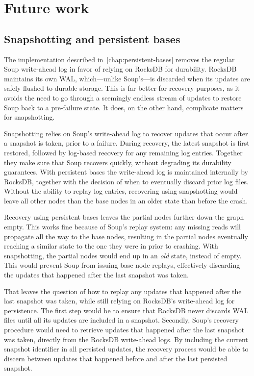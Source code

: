

\section{Future work}\label{sec:future-work}

\subsection{Snapshotting and persistent bases}

The  implementation described
in~\ref{chap:persistent-bases} removes the regular Soup write-ahead log in favor
of relying on RocksDB for durability. RocksDB maintains its own WAL,
which---unlike Soup's---is discarded when its updates are safely flushed to
durable storage. This is far better for recovery purposes, as it avoids the need
to go through a seemingly endless stream of updates to restore Soup back to a
pre-failure state. It does, on the other hand, complicate matters for
snapshotting.

Snapshotting relies on Soup's write-ahead log to recover updates that occur
after a snapshot is taken, prior to a failure. During recovery, the latest
snapshot is first restored, followed by log-based recovery for any remaining log
entries. Together they make sure that Soup recovers quickly, without degrading
its durability guarantees. With persistent bases the write-ahead log is
maintained internally by RocksDB, together with the decision of when to
eventually discard prior log files. Without the ability to replay log entries,
recovering using snapshotting would leave all other nodes than the base nodes in
an older state than before the crash.

Recovery using persistent bases leaves the partial nodes further down the graph
empty. This works fine because of Soup's replay system: any missing reads will
propagate all the way to the base nodes, resulting in the partial nodes
eventually reaching a similar state to the one they were in prior to crashing.
With snapshotting, the partial nodes would end up in an \textit{old} state,
instead of empty. This would prevent Soup from issuing base node replays,
effectively discarding the updates that happened after the last snapshot was
taken.

That leaves the question of how to replay any updates that happened after the
last snapshot was taken, while still relying on RocksDB's write-ahead log for
persistence. The first step would be to ensure that RocksDB never discards WAL
files until all its updates are included in a snapshot. Secondly, Soup's
recovery procedure would need to retrieve updates that happened after the last
snapshot was taken, directly from the RocksDB write-ahead logs. By including the
current snapshot identifier in all persisted updates, the recovery process would
be able to discern between updates that happened before and after the last
persisted snapshot.

